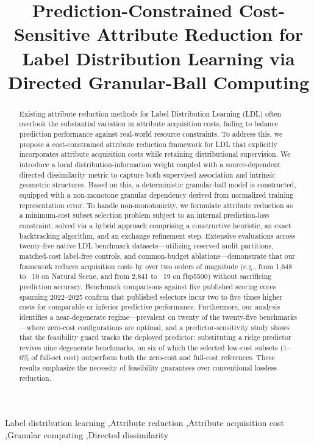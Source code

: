 \documentclass[preprint,12pt]{elsarticle}
\numberwithin{equation}{section}
\begin{document}
\begin{frontmatter}
\title{Prediction-Constrained Cost-Sensitive Attribute Reduction for Label Distribution Learning via Directed Granular-Ball Computing}

\begin{abstract}
Existing attribute reduction methods for Label Distribution Learning (LDL) often overlook the substantial variation in attribute acquisition costs, failing to balance prediction performance against real-world resource constraints. To address this, we propose a cost-constrained attribute reduction framework for LDL that explicitly incorporates attribute acquisition costs while retaining distributional supervision. We introduce a local distribution-information weight coupled with a source-dependent directed dissimilarity metric to capture both supervised association and intrinsic geometric structures. Based on this, a deterministic granular-ball model is constructed, equipped with a non-monotone granular dependency derived from normalized training representation error. To handle non-monotonicity, we formulate attribute reduction as a minimum-cost subset selection problem subject to an internal prediction-loss constraint, solved via a hybrid approach comprising a constructive heuristic, an exact backtracking algorithm, and an exchange refinement step. Extensive evaluations across twenty-five native LDL benchmark datasets—utilizing reserved audit partitions, matched-cost label-free controls, and common-budget ablations—demonstrate that our framework reduces acquisition costs by over two orders of magnitude (e.g., from 1,648 to ~10 on Natural Scene, and from 2,841 to ~19 on fbp5500) without sacrificing prediction accuracy. Benchmark comparisons against five published scoring cores spanning 2022–2025 confirm that published selectors incur two to five times higher costs for comparable or inferior predictive performance. Furthermore, our analysis identifies a near-degenerate regime—prevalent on twenty of the twenty-five benchmarks—where zero-cost configurations are optimal, and a predictor-sensitivity study shows that the feasibility guard tracks the deployed predictor: substituting a ridge predictor revives nine degenerate benchmarks, on six of which the selected low-cost subsets (1--6\% of full-set cost) outperform both the zero-cost and full-cost references. These results emphasize the necessity of feasibility guarantees over conventional lossless reduction.
\end{abstract}
\begin{keyword}
Label distribution learning \sep Attribute reduction \sep Attribute acquisition cost \sep Granular computing \sep Directed dissimilarity
\end{keyword}
\end{frontmatter}

\end{document}
